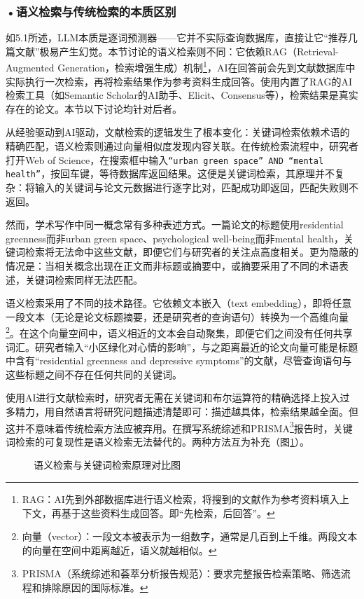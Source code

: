 \subsubsection*{\textbf{•语义检索与传统检索的本质区别}}

如5.1所述，LLM本质是逐词预测器——它并不实际查询数据库，直接让它``推荐几篇文献''极易产生幻觉。本节讨论的语义检索则不同：它依赖RAG（Retrieval-Augmented Generation，检索增强生成）机制\footnote{RAG：AI先到外部数据库进行语义检索，将搜到的文献作为参考资料填入上下文，再基于这些资料生成回答。即``先检索，后回答''。}，AI在回答前会先到文献数据库中实际执行一次检索，再将检索结果作为参考资料生成回答。使用内置了RAG的AI检索工具（如Semantic Scholar的AI助手、Elicit、Consensus等），检索结果是真实存在的论文。本节以下讨论均针对后者。

从经验驱动到AI驱动，文献检索的逻辑发生了根本变化：关键词检索依赖术语的精确匹配，语义检索则通过向量相似度发现内容关联。在传统检索流程中，研究者打开Web of Science，在搜索框中输入\texttt{``urban green space'' AND ``mental health''}，按回车键，等待数据库返回结果。这便是关键词检索，其原理并不复杂：将输入的关键词与论文元数据进行逐字比对，匹配成功即返回，匹配失败则不返回。

然而，学术写作中同一概念常有多种表述方式。一篇论文的标题使用residential greenness而非urban green space、psychological well-being而非mental health，关键词检索将无法命中这些文献，即便它们与研究者的关注点高度相关。更为隐蔽的情况是：当相关概念出现在正文而非标题或摘要中，或摘要采用了不同的术语表述，关键词检索同样无法匹配。

语义检索采用了不同的技术路径。它依赖文本嵌入（text embedding），即将任意一段文本（无论是论文标题摘要，还是研究者的查询语句）转换为一个高维向量\footnote{向量（vector）：一段文本被表示为一组数字，通常是几百到上千维。两段文本的向量在空间中距离越近，语义就越相似。}。在这个向量空间中，语义相近的文本会自动聚集，即便它们之间没有任何共享词汇。研究者输入``小区绿化对心情的影响''，与之距离最近的论文向量可能是标题中含有``residential greenness and depressive symptoms''的文献，尽管查询语句与这些标题之间不存在任何共同的关键词。

使用AI进行文献检索时，研究者无需在关键词和布尔运算符的精确选择上投入过多精力，用自然语言将研究问题描述清楚即可：描述越具体，检索结果越全面。但这并不意味着传统检索方法应被弃用。在撰写系统综述和PRISMA\footnote{PRISMA（系统综述和荟萃分析报告规范）：要求完整报告检索策略、筛选流程和排除原因的国际标准。}报告时，关键词检索的可复现性是语义检索无法替代的。两种方法互为补充（图\ref{fig:ch5_03}）。

\begin{figure}[H]
\centering
{}
\caption{语义检索与关键词检索原理对比图}
\label{fig:ch5_03}
\end{figure}
\par

